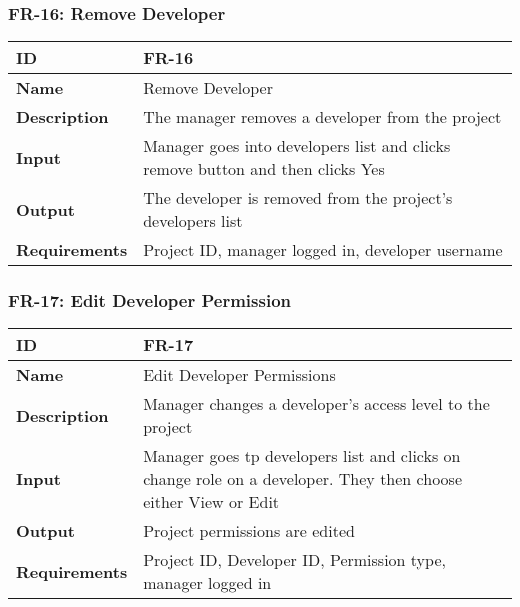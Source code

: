 \subsubsection{FR-16: Remove Developer}
\begin{center}
  \begin{tabularx}{\textwidth}{|l|X|}
      \hline
      \textbf{ID} & FR-16 \\
      \hline
      \textbf{Name} & Remove Developer \\
      \hline
      \textbf{Description} & The manager removes a developer from the project \\
      \hline
      \textbf{Input} & Manager goes into developers list and clicks remove button and then clicks Yes \\
      \hline
      \textbf{Output} & The developer is removed from the project's developers list \\
      \hline
      \textbf{Requirements} & Project ID, manager logged in, developer username \\
      \hline
  \end{tabularx}
\end{center}

\subsubsection{FR-17: Edit Developer Permission}
\begin{center}
  \begin{tabularx}{\textwidth}{|l|X|}
      \hline
      \textbf{ID} & FR-17 \\
      \hline
      \textbf{Name} & Edit Developer Permissions \\
      \hline
      \textbf{Description} & Manager changes a developer's access level to the project \\
      \hline
      \textbf{Input} & Manager goes tp developers list and clicks on change role on a developer. They then choose either View or Edit \\
      \hline
      \textbf{Output} & Project permissions are edited \\
      \hline
      \textbf{Requirements} & Project ID, Developer ID, Permission type, manager logged in \\
      \hline
  \end{tabularx}
\end{center}

